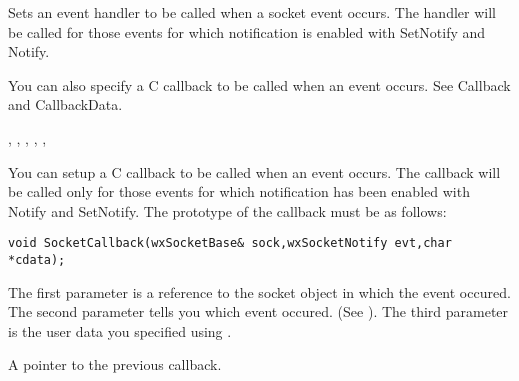 \label{wxsocketbaseseteventhandler}


Sets an event handler to be called when a socket event occurs. The handler
will be called for those events for which notification is enabled with
SetNotify and Notify.

You can also specify a C callback to be called when an event occurs. See
Callback and CallbackData.





, 
, 
, 
, 
, 

\label{wxsocketbasecallback}


You can setup a C callback to be called when an event occurs. The callback
will be called only for those events for which notification has been enabled
with Notify and SetNotify. The prototype of the callback must be as follows:

\begin{verbatim}
void SocketCallback(wxSocketBase& sock,wxSocketNotify evt,char *cdata);
\end{verbatim}

The first parameter is a reference to the socket object in which the event
occured. The second parameter tells you which event occured. (See ).
The third parameter is the user data you specified using .


A pointer to the previous callback.

